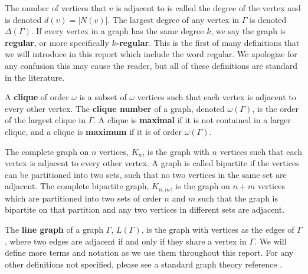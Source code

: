 \documentclass[12pt]{report}
\theoremstyle{definition}
\begin{document}
The number of vertices that $v$ is adjacent to is called the degree of the vertex and is denoted $d(v)=|N(v)|$. The largest degree of any vertex in $\Gamma$ is denoted $\Delta(\Gamma)$. If every vertex in a graph has the same degree $k$, we say the graph is \textbf{regular}, or more specifically \textbf{$k$-regular}. This is the first of many definitions that we will introduce in this report which include the word regular. We apologize for any confusion this may cause the reader, but all of these definitions are standard in the literature.\par
A \textbf{clique} of order $\omega$ is a subset of $\omega$ vertices such that each vertex is adjacent to every other vertex. The \textbf{clique number} of a graph, denoted $\omega(\Gamma)$, is the order of the largest clique in $\Gamma$. A clique is \textbf{maximal} if it is not contained in a larger clique, and a clique is \textbf{maximum} if it is of order $\omega(\Gamma)$.\par
The complete graph on $n$ vertices, $K_n$, is the graph with $n$ vertices such that each vertex is adjacent to every other vertex. A graph is called bipartite if the vertices can be partitioned into two sets, such that no two vertices in the same set are adjacent. The complete bipartite graph, $K_{n,m}$, is the graph on $n+m$ vertices which are partitioned into two sets of order $n$ and $m$ such that the graph is bipartite on that partition and any two vertices in different sets are adjacent.\par
The \textbf{line graph} of a graph $\Gamma$, $L(\Gamma)$, is the graph with vertices as the edges of $\Gamma$, where two edges are adjacent if and only if they share a vertex in $\Gamma$. We will define more terms and notation as we use them throughout this report. For any other definitions not specified, please see a standard graph theory reference \cite{harary}.\par
\clearpage
\end{document}
